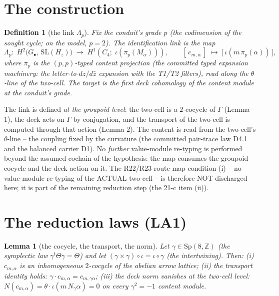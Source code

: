 \documentclass[11pt]{article}
\newtheorem{lemma}[theorem]{Lemma}
\newtheorem{definition}[theorem]{Definition}
\newcommand{\Z}{\mathbb{Z}}
\newcommand{\Sp}{\mathrm{Sp}}
\begin{document}
\section{The construction}

\begin{definition}[the link $\Lambda_p$]
Fix the conduit's grade $p$ (the codimension of the sought cycle; on the
model, $p=2$). The \emph{identification link} is the map
\[
  \Lambda_p:\; H^2\big(G_\bullet,\,\mathrm{SL}(H_z)\big)
  \;\longrightarrow\; H^1\!\left(C_4;\;\iota\!\left(\pi_p(M_\alpha)\right)\right),
  \qquad
  [\,c_{m,\alpha}\,]\;\longmapsto\;\big[\,\iota\!\left(m\,\pi_p(\alpha)\right)\,\big],
\]
where $\pi_p$ is the $(p,p)$-typed content projection (the committed typed
expansion machinery: the letter-to-$dz/d\bar z$ expansion with the T1/T2
filters), read along the $\theta$-line of the two-cell. The target is the
first deck cohomology of the content module at the conduit's grade.
\end{definition}

The link is defined \emph{at the groupoid level}: the two-cell is a
$2$-cocycle of $\Gamma$ (Lemma 1), the deck acts on $\Gamma$ by conjugation,
and the transport of the two-cell is computed through that action
(Lemma 2). The content is read from the two-cell's $\theta$-line -- the
coupling fixed by the curvature (the committed pair-trace law D4.1 and the
balanced carrier D1). No \emph{further} value-module re-typing is performed
beyond the assumed cochain of the hypothesis: the map consumes the groupoid
cocycle and the deck action on it. The R22/R23 route-map condition (i) --
no value-module re-typing of the ACTUAL two-cell -- is therefore NOT
discharged here; it is part of the remaining reduction step (the 21-c
item (ii)).

\section{The reduction laws (LA1)}

\begin{lemma}[the cocycle, the transport, the norm]
Let $\gamma\in\Sp(8,\Z)$ (the symplectic law
$\gamma^t\Theta\gamma=\Theta$) and let $(\gamma\times\gamma)\circ
\iota=\iota\circ\gamma$ (the intertwining). Then:
(i) $c_{m,\alpha}$ is an inhomogeneous $2$-cocycle of the abelian arrow
lattice;
(ii) the transport identity holds:
$\gamma\cdot c_{m,\alpha}=c_{m,\gamma\alpha}$;
(iii) the deck norm vanishes at the two-cell level:
$N(c_{m,\alpha})=\theta\cdot\iota(m\,N_\gamma\alpha)=0$ on every
$\gamma^2=-1$ content module.
\end{lemma}
\end{document}
